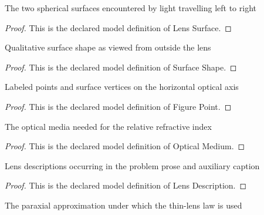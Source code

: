 \begin{definition}
  \label{def:physics:phyx-mini-0133:phyxminiproblems-problemphyxmini0133-lenssurface}
  The two spherical surfaces encountered by light travelling left to right
\end{definition}
\begin{proof}
  This is the declared model definition of Lens Surface.
\end{proof}
\begin{definition}
  \label{def:physics:phyx-mini-0133:phyxminiproblems-problemphyxmini0133-surfaceshape}
  Qualitative surface shape as viewed from outside the lens
\end{definition}
\begin{proof}
  This is the declared model definition of Surface Shape.
\end{proof}
\begin{definition}
  \label{def:physics:phyx-mini-0133:phyxminiproblems-problemphyxmini0133-figurepoint}
  Labeled points and surface vertices on the horizontal optical axis
\end{definition}
\begin{proof}
  This is the declared model definition of Figure Point.
\end{proof}
\begin{definition}
  \label{def:physics:phyx-mini-0133:phyxminiproblems-problemphyxmini0133-opticalmedium}
  The optical media needed for the relative refractive index
\end{definition}
\begin{proof}
  This is the declared model definition of Optical Medium.
\end{proof}
\begin{definition}
  \label{def:physics:phyx-mini-0133:phyxminiproblems-problemphyxmini0133-lensdescription}
  Lens descriptions occurring in the problem prose and auxiliary caption
\end{definition}
\begin{proof}
  This is the declared model definition of Lens Description.
\end{proof}
\begin{definition}
  \label{def:physics:phyx-mini-0133:phyxminiproblems-problemphyxmini0133-opticalapproximation}
  The paraxial approximation under which the thin-lens law is used
\end{definition}
